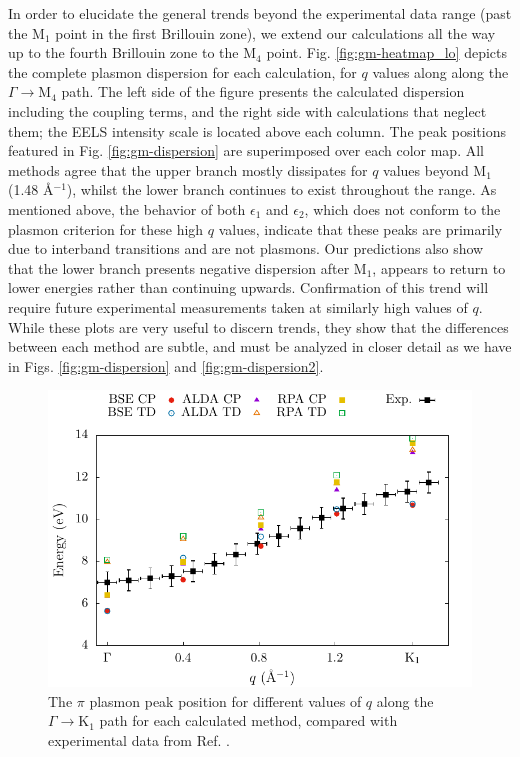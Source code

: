 \documentclass[aps,prb,10pt,showpacs,superscriptaddress,twocolumn,notitlepage]{revtex4-1}
\begin{document}
In order to elucidate the general trends beyond the experimental data range
(past the M$_{1}$ point in the first Brillouin zone), we extend our calculations
all the way up to the fourth Brillouin zone to the M$_{4}$ point. Fig.
\ref{fig:gm-heatmap_lo} depicts the complete plasmon dispersion for each
calculation, for $q$ values along along the $\Gamma \rightarrow
\mathrm{M}_{4}$ path. The left side of the figure presents the calculated
dispersion including the coupling terms, and the right side with calculations
that neglect them; the EELS intensity scale is located above each column. The
peak positions featured in Fig. \ref{fig:gm-dispersion} are superimposed over
each color map. All methods agree that the upper branch mostly dissipates for
$q$ values beyond M$_{1}$ (1.48 \r{A}$^{-1}$), whilst the lower branch continues
to exist throughout the range. As mentioned above, the behavior of both
$\epsilon_{1}$ and $\epsilon_{2}$, which does not conform to the plasmon
criterion for these high $q$ values, indicate that these peaks are primarily due
to interband transitions and are not plasmons. Our predictions also show that
the lower branch presents negative dispersion after M$_{1}$, appears to return
to lower energies rather than continuing upwards. Confirmation of this trend
will require future experimental measurements taken at similarly high values of
$q$. While these plots are very useful to discern trends, they show that the
differences between each method are subtle, and must be analyzed in closer
detail as we have in Figs. \ref{fig:gm-dispersion} and \ref{fig:gm-dispersion2}.

\begin{figure}[b]
\includegraphics[width=\linewidth]{fig07}
\caption{The $\pi$ plasmon peak position for different values of $q$ along the
$\Gamma \rightarrow \mathrm{K}_{1}$ path for each calculated method, compared
with experimental data from Ref. .}
\label{fig:gk-dispersion}
\end{figure}
\end{document}

